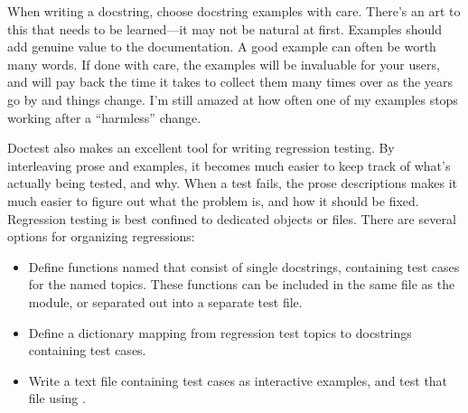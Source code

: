 When writing a docstring, choose docstring examples with care.
There's an art to this that needs to be learned---it may not be
natural at first.  Examples should add genuine value to the
documentation.  A good example can often be worth many words.
If done with care, the examples will be invaluable for your users, and
will pay back the time it takes to collect them many times over as the
years go by and things change.  I'm still amazed at how often one of
my  examples stops working after a ``harmless''
change.

Doctest also makes an excellent tool for writing regression testing.
By interleaving prose and examples, it becomes much easier to keep
track of what's actually being tested, and why.  When a test fails,
the prose descriptions makes it much easier to figure out what the
problem is, and how it should be fixed.  Regression testing is best
confined to dedicated objects or files.  There are several options for
organizing regressions:

\begin{itemize}
\item Define functions named  that
      consist of single docstrings, containing test cases for the
      named topics.  These functions can be included in the same file
      as the module, or separated out into a separate test file.
\item Define a  dictionary mapping from regression test
      topics to docstrings containing test cases.
\item Write a text file containing test cases as interactive examples,
      and test that file using .
\end{itemize}



